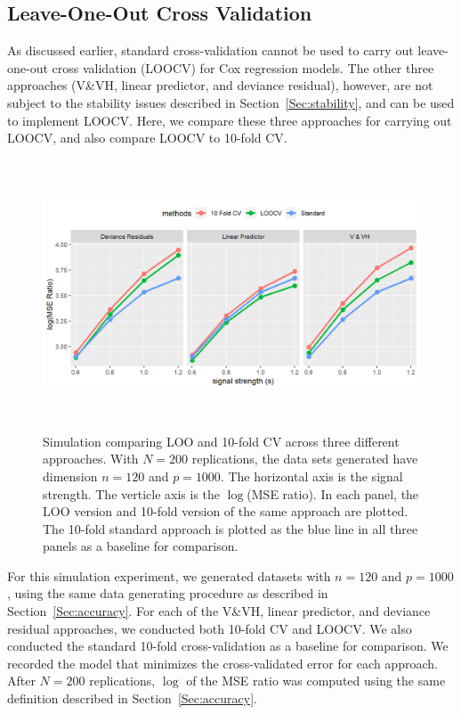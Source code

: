 \subsection {Leave-One-Out Cross Validation}
\label{Sec:loocv}

As discussed earlier, standard cross-validation cannot be used to carry out leave-one-out cross validation (LOOCV) for Cox regression models. The other three approaches (V\&VH, linear predictor, and deviance residual), however, are not subject to the stability issues described in Section~\ref{Sec:stability}, and can be used to implement LOOCV.  Here, we compare these three approaches for carrying out LOOCV, and also compare LOOCV to 10-fold CV.

\begin{figure}[h]
  \centering
  \includegraphics[height= 8cm ]{./manuscript_figure/figure_4.png}
  \caption{\label{Fig:loocv}Simulation comparing LOO and 10-fold CV across three different approaches. With $N = 200$ replications, the data sets generated have dimension $n = 120$ and $p = 1000$. The horizontal axis is the signal strength. The verticle axis is the $\log$(MSE ratio). In each panel, the LOO version and 10-fold version of the same approach are plotted. The 10-fold standard approach is plotted as the blue line in all three panels as a baseline for comparison. }
\end{figure}	

For this simulation experiment, we generated datasets with $n = 120$ and $p = 1000$, using the same data generating procedure as described in Section~\ref{Sec:accuracy}. For each of the V\&VH, linear predictor, and deviance residual approaches, we conducted both 10-fold CV and LOOCV. We also conducted the standard 10-fold cross-validation as a baseline for comparison. We recorded the model that minimizes the cross-validated error  for each approach. After $N = 200$ replications, $\log$ of the MSE ratio was computed using the same definition described in Section~\ref{Sec:accuracy}.

